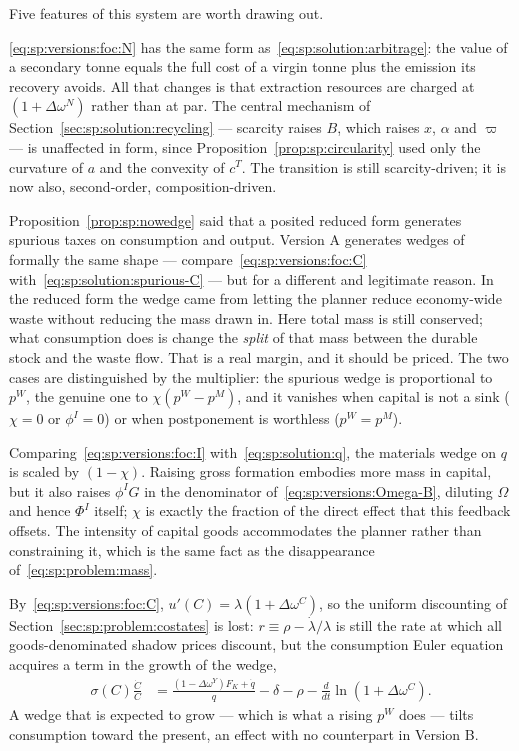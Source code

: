 Five features of this system are worth drawing out.

 \eqref{eq:sp:versions:foc:N} has the same
form as~\eqref{eq:sp:solution:arbitrage}: the value of a secondary tonne equals the full cost of a
virgin tonne plus the emission its recovery avoids. All that changes is that extraction resources
are charged at $\left(1+\Delta\omega^N\right)$ rather than at par. The central mechanism of
Section~\ref{sec:sp:solution:recycling} --- scarcity raises $B$, which raises $x$, $\alpha$ and
$\varpi$ --- is unaffected in form, since Proposition~\ref{prop:sp:circularity} used only the
curvature of $a$ and the convexity of $c^T$. The transition is still scarcity-driven; it is now
also, second-order, composition-driven.

 Proposition~\ref{prop:sp:nowedge} said that a
posited reduced form generates spurious taxes on consumption and output. Version A generates wedges
of formally the same shape --- compare~\eqref{eq:sp:versions:foc:C}
with~\eqref{eq:sp:solution:spurious-C} --- but for a different and legitimate reason. In the
reduced form the wedge came from letting the planner reduce economy-wide waste without reducing the
mass drawn in. Here total mass is still conserved; what consumption does is change the \emph{split}
of that mass between the durable stock and the waste flow. That is a real margin, and it should be
priced. The two cases are distinguished by the multiplier: the spurious wedge is proportional to
$p^W$, the genuine one to $\chi\left(p^W-p^M\right)$, and it vanishes when capital is not a sink
($\chi=0$ or $\phi^I=0$) or when postponement is worthless ($p^W=p^M$).

 Comparing~\eqref{eq:sp:versions:foc:I}
with~\eqref{eq:sp:solution:q}, the materials wedge on $q$ is scaled by $\left(1-\chi\right)$. Raising
gross formation embodies more mass in capital, but it also raises $\phi^IG$ in the denominator
of~\eqref{eq:sp:versions:Omega-B}, diluting $\Omega$ and hence $\Phi^I$ itself; $\chi$ is exactly the
fraction of the direct effect that this feedback offsets. The intensity of capital goods
accommodates the planner rather than constraining it, which is the same fact as the disappearance
of~\eqref{eq:sp:problem:mass}.

 By~\eqref{eq:sp:versions:foc:C},
$u'(C)=\lambda\left(1+\Delta\omega^C\right)$, so the uniform discounting of
Section~\ref{sec:sp:problem:costates} is lost: $r\equiv\rho-\dot\lambda/\lambda$ is still the rate at
which all goods-denominated shadow prices discount, but the consumption Euler equation acquires a
term in the growth of the wedge,
\begin{align}
\sigma\left(C\right)\frac{\dot C}{C}
&= \frac{\left(1-\Delta\omega^Y\right)F_K+\dot q}{q}-\delta-\rho
-\frac{d}{dt}\ln\!\left(1+\Delta\omega^C\right).
\label{eq:sp:versions:euler}
\end{align}
A wedge that is expected to grow --- which is what a rising $p^W$ does --- tilts consumption toward
the present, an effect with no counterpart in Version B.

